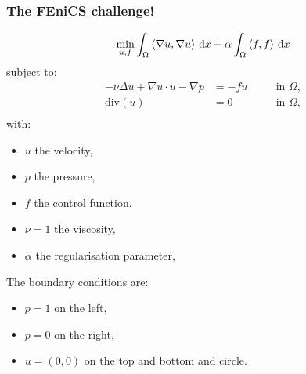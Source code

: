 \begin{frame}
    \frametitle{The FEniCS challenge!}

    \begin{equation*}
        \min_{u, f} \int_\Omega \left<\nabla u, \nabla u\right> \, \mathrm{d}x + \alpha \int_\Omega \left<f, f\right>\, \mathrm{d}x
    \end{equation*}
    subject to:
    \begin{equation*}
        \begin{aligned}
            - \nu \Delta u + \nabla u \cdot u - \nabla p & = -fu  \quad && \textrm{in } \Omega, \\
            \textrm{div}(u) & = 0 \quad && \textrm{in } \Omega, \\
    \end{aligned}
    \end{equation*}
    with:
        \begin{itemize}
            \item $u$ the velocity,
            \item $p$ the  pressure,
            \item $f$ the control function.
            \item $\nu = 1$ the viscosity,
            \item $\alpha$ the regularisation parameter,
        \end{itemize}
    The boundary conditions are:
        \begin{itemize}
            \item $p = 1$ on the left,
            \item $p = 0$ on the right,
            \item $u = (0,0)$ on the top and bottom and circle.
        \end{itemize}


\end{frame}


